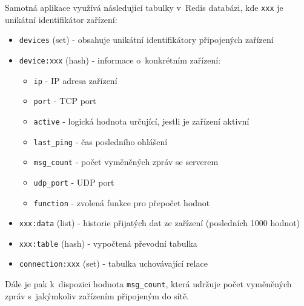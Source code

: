 Samotná aplikace využívá následující tabulky v~Redis databázi, kde \texttt{xxx} je unikátní identifikátor zařízení: 

\begin{itemize}
\itemsep0em
\item \texttt{devices} (set) - obsahuje unikátní identifikátory připojených zařízení
\item \texttt{device:xxx} (hash) - informace o~konkrétním zařízení:
	\begin{itemize}
	\itemsep0em
		\item \texttt{ip} - IP adresa zařízení
		\item \texttt{port} - TCP port
		\item \texttt{active} - logická hodnota určující, jestli je zařízení aktivní
		\item \texttt{last\_ping} - čas posledního ohlášení
		\item \texttt{msg\_count} - počet vyměněných zpráv se serverem
		\item \texttt{udp\_port} - UDP port
		\item \texttt{function} - zvolená funkce pro přepočet hodnot
	\end{itemize}
\item \texttt{xxx:data} (list) - historie přijatých dat ze zařízení (posledních 1000 hodnot)
\item \texttt{xxx:table} (hash) - vypočtená převodní tabulka
\item \texttt{connection:xxx} (set) - tabulka uchovávající relace
\end{itemize}

Dále je pak k~dispozici hodnota \texttt{msg\_count}, která udržuje počet vy\-mě\-ně\-ných zpráv s~jakýmkoliv zařízením připojeným do sítě.

